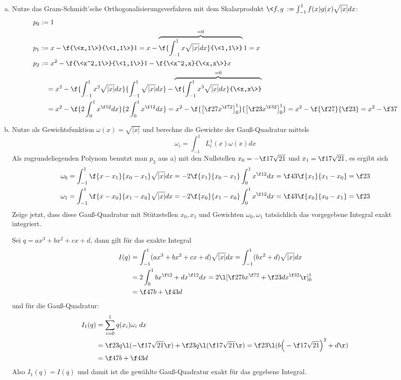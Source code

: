 \documentclass{mywork}
\begin{document}
\begin{aufgabe}
	\begin{enumerate}[a)]
		\item
			Nutze das Gram-Schmidt'sche Orthogonalisierungsverfahren mit dem Skalarprodukt $\<f,g\> := \int_{-1}^1 f(x)g(x) \sqrt{|x|} dx$:
			\begin{align*}
				p_0 &:= 1 \\
				p_1 &:= x - \f {\<x,1\>}{\<1,1\>}1 = x - \overbrace{\f{\int_{-1}^1 x\sqrt{|x|} dx}{\<1,1\>}}^{=0} 1 = x \\
				p_2 &:= x^2 - \f {\<x^2,1\>}{\<1,1\>} 1 - \f{\<x^2,x}{\<x,x\>}x \\
				&\quad = x^2 - \f{\int_{-1}^1 x^2\sqrt{|x|} dx}{\int_{-1}^1 \sqrt{|x|} dx} - \overbrace{\f{\int_{-1}^1 x^3 \sqrt{|x|} dx}{\<x,x\>}}^{=0} \\
				&\quad = x^2 - \f {2 \int_0^1 x^{\f 52} dx} {2\int_0^1 x^{\f 12} dx} 
				= x^2 - \f {\big[\f 27x^{\f72}\big]_0^1}{\big[\f 23x^{\f 32}\big]_0^1}
				= x^2 - \f {\f 27}{\f 23}
				= x^2 - \f 37
			\end{align*}
		\item
			Nutze als Gewichtsfunktion $\omega(x) = \sqrt{|x|}$ und berechne die Gewichte der Gauß-Quadratur mittels
			\[
				\omega_i = \int_{-1}^1 L_i^1 (x) \omega(x) dx
			\]
			Als zugrundeliegenden Polynom benutzt man $p_2$ aus a) mit den Nullstellen $x_0=-\f 17\sqrt{21}$  und $x_1=\f 17\sqrt{21}$, es ergibt sich
			\begin{align*}
				\omega_0 &= \int_{-1}^1 \f {x-x_1}{x_0-x_1}\sqrt{|x|} dx = -2 \f{x_1}{x_0-x_1} \int_0^1 x^{\f 12} dx = \f 43 \f {x_1}{x_1-x_0} = \f 23 \\
				\omega_1 &= \int_{-1}^1 \f{x-x_0}{x_1-x_0}\sqrt{|x|} dx = -2 \f{x_0}{x_1-x_0} \int_0^1 x^{\f 12} dx = \f 43 \f {x_0}{x_0-x_1} = \f 23
			\end{align*}
			Zeige jetzt, dass diese Gauß-Quadratur mit Stützstellen $x_0, x_1$ und Gewichten $\omega_0,\omega_1$ tatsächlich das vorgegebene Integral exakt integriert.

			Sei $q=ax^3 + bx^2 + cx + d$, dann gilt für das exakte Integral
			\begin{align*}
				I(q) 
				&= \int_{-1}^1 (ax^3 + bx^2 + cx + d)\sqrt{|x|} dx 
				= \int_{-1}^1 (bx^2 + d)\sqrt{|x|} dx \\
				&= 2 \int_0^1 bx^{\f 52} + dx^{\f 12} dx 
				= 2 \l[ \f 27 bx^{\f 72} + \f 23 dx^{\f 32}\r]_0^1 \\
				&= \f 47 b + \f 43 d
			\end{align*}
			und für die Gauß-Quadratur:
			\begin{align*}
				I_1(q)
				&= \sum_{i=0}^1 q(x_i) \omega_i \;dx \\
				&= \f 23 q\l( -\f17 \sqrt{21}\r) + \f 23 q\l(\f 17 \sqrt{21}\r) 
				= \f 23 \l( b\Big(-\f 17 \sqrt{21}\Big)^2 + d \r) \\
				&= \f 47 b + \f 43 d
			\end{align*}
			Also $I_1(q) = I(q)$ und damit ist die gewählte Gauß-Quadratur exakt für das gegebene Integral.
	\end{enumerate}
\end{aufgabe}
\end{document}
